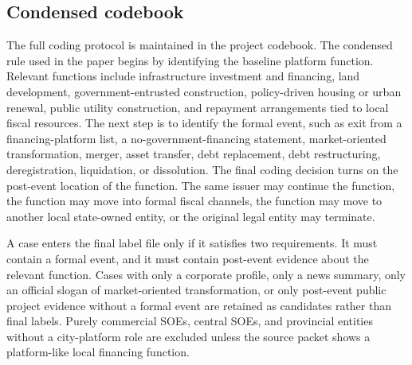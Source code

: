 \subsection{Condensed codebook}

The full coding protocol is maintained in the project codebook. The condensed
rule used in the paper begins by identifying the baseline platform function.
Relevant functions include infrastructure investment and financing,
land development, government-entrusted construction, policy-driven housing or
urban renewal, public utility construction, and repayment arrangements tied to
local fiscal resources. The next step is to identify the formal event, such as
exit from a financing-platform list, a no-government-financing statement,
market-oriented transformation, merger, asset transfer, debt replacement, debt
restructuring, deregistration, liquidation, or dissolution. The final coding
decision turns on the post-event location of the function. The same issuer may
continue the function, the function may move into formal fiscal channels, the
function may move to another local state-owned entity, or the original legal
entity may terminate.

A case enters the final label file only if it satisfies two requirements. It
must contain a formal event, and it must contain post-event evidence about the
relevant function. Cases with only a corporate profile, only a news summary,
only an official slogan of market-oriented transformation, or only
post-event public project evidence without a formal event are retained as
candidates rather than final labels. Purely commercial SOEs, central SOEs, and
provincial entities without a city-platform role are excluded unless the source
packet shows a platform-like local financing function.

